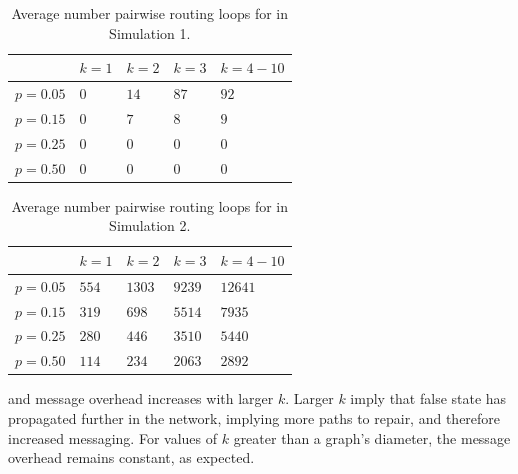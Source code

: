 \begin{table}
\begin{center}
\begin{tabular}{l|l|l|l|l}
 & $k=1$&  $k=2$ & $k=3$ & $k=4-10$ \\
\hline
 $p=0.05$  & $0$ & $14$ & $87$ &  $92$ \\
 $p=0.15$  & $0$ & $7$&  $8$ & $9$ \\
 $p=0.25$  & $0$ & $0$ & $0$ &  $0$ \\
 $p=0.50$  & $0$ & $0$ & $0$ &  $0$ \\
\end{tabular}
\end{center}
\caption{Average number pairwise routing loops for \second in Simulation 1.}
\label{tab:loop1}
\end{table}

\begin{table}
\begin{center}
\begin{tabular}{l|l|l|l|l}
 & $k=1$&  $k=2$ & $k=3$ & $k=4-10$ \\
\hline
  $p=0.05$  & $554$ & $1303$ & $9239$ &  $12641$ \\
 $p=0.15$  & $319$ & $698$&  $5514$ & $7935$ \\
 $p=0.25$  & $280$ & $446$ & $3510$ &  $5440$ \\
 $p=0.50$  & $114$ & $234$ & $2063$ &  $2892$ \\
\end{tabular}
\end{center}
\caption{Average number pairwise routing loops for \second in Simulation 2.}
\label{tab:loop2}
\end{table}


\purge and \second message overhead increases with larger $k$. Larger $k$ imply that false state has propagated further in the network, 
implying more paths to repair, and therefore increased messaging.
For values of $k$ greater than a graph's diameter, the message overhead remains constant, as expected. 


